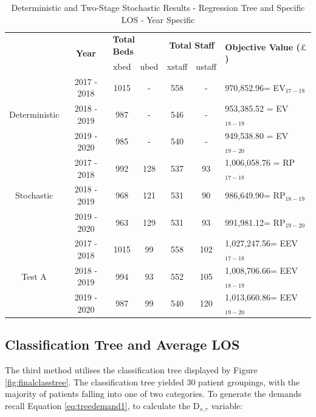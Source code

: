 \documentclass[../thesis.tex]{subfiles}
\begin{document}
\begin{table}[h!]
    \centering
    \begin{tabular}{ccccccl}\toprule
 & \multirow{2}{*}{\textbf{Year}}& \multicolumn{2}{l}{\textbf{Total Beds}} & \multicolumn{2}{c}{\textbf{Total Staff}} & \multirow{2}{*}{\textbf{Objective Value ($\pounds$)}}\\ \cmidrule(lr){3-4} \cmidrule(lr){5-6}
&& xbed           & ubed          & xstaff         & ustaff         \\ \midrule
     \multirow{3}{*}{Deterministic} & 2017 - 2018 & 1015 & - & 558 & - & 970,852.96=  EV$_{17-18}$ \\ 
      & 2018 - 2019 &987 & - & 546 & - & 953,385.52 =  EV$_{18-19}$ \\
      & 2019 - 2020 &  985 & - & 540 & -&  949,538.80 = EV$_{19-20}$\\\midrule
     \multirow{3}{*}{Stochastic} & 2017 - 2018 & 992 & 128&537 & 93 & 1,006,058.76  =  RP$_{17-18}$ \\ 
      & 2018 - 2019 &968&121& 531& 90& 986,649.90=  RP$_{18-19}$ \\
      & 2019 - 2020 & 963  &  129& 531& 93& 991,981.12=  RP$_{19-20}$\\ \midrule
      \multirow{3}{*}{Test A}& 2017 - 2018 & 1015 & 99 &558&102 & 1,027,247.56= EEV$_{17-18}$\\
      & 2018 - 2019 &994& 93&552&105&1,008,706.66= EEV$_{18-19}$\\
      & 2019 - 2020 & 987 & 99 & 540 & 120& 1,013,660.86= EEV$_{19-20}$\\\bottomrule      
    \end{tabular}
    \caption{Deterministic and Two-Stage Stochastic Results - Regression Tree and Specific LOS - Year Specific}
    \label{tab:Results5}
\end{table}

















\subsection{Classification Tree and Average LOS}
The third method utilises the classification tree displayed by Figure \ref{fig:finalclasstree}. The classification tree yielded 30 patient groupings, with the majority of patients falling into one of two categories. To generate the demands recall Equation \eqref{eq:treedemand1}, to calculate the D$_{s,r}$ variable:
\end{document}
